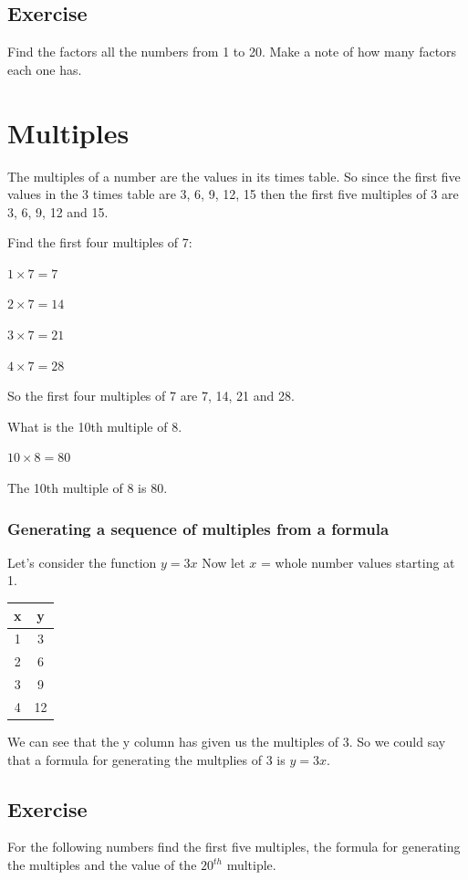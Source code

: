 \subsection{Exercise}
Find the factors all the numbers from 1 to 20.  Make a note of how many factors each one has.

\section{Multiples}
The multiples of a number are the values in its times table.  So since the first five values in the 3 times table are 3, 6, 9, 12, 15 then the first five multiples of 3 are 3, 6, 9, 12 and 15.
\begin{exmp}
Find the first four multiples of 7:

$1 \times 7 = 7$

$2 \times 7 = 14$

$3 \times 7 = 21$

$4 \times 7 = 28$

So the first four multiples of 7 are 7, 14, 21 and 28.
\end{exmp}
\begin{exmp}
What is the 10th multiple of 8.

$10 \times 8 = 80$

The 10th multiple of 8 is 80.
\end{exmp}
\subsubsection{Generating a sequence of multiples from a formula}
Let's consider the function $y=3x$
Now let $x$ = whole number values starting at 1.

\begin{tabular}{c|c}
x & y \\
\hline
1 & 3 \\
2 & 6 \\
3 & 9 \\
4 & 12
\end{tabular}

We can see that the y column has given us the multiples of 3.  So we could say that a formula for generating the multplies of 3 is $y=3x$.

\subsection{Exercise}
For the following numbers find the first five multiples, the formula for generating the multiples and the value of the $20^{th}$ multiple.


